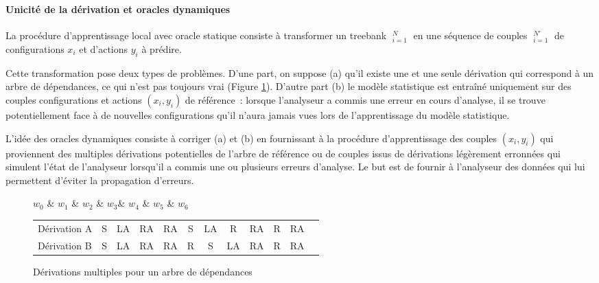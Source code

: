 \documentclass[11pt,openany]{book}
\begin{document}
\paragraph{Unicité de la dérivation et oracles dynamiques}

La procédure d'apprentissage local avec oracle statique 
consiste à transformer un treebank $\mathop{(\mathbf{x}_i,\mathbf{y}_i)}^N_{i=1}$
en une séquence de couples $\mathop{(x_i,y_i)}_{i=1}^{N'}$
de configurations $x_i$ et d'actions $y_i$ à prédire.

Cette transformation pose deux types de problèmes. D'une part, on
suppose (a) qu'il existe une et une seule dérivation qui correspond à un
arbre de dépendances, ce qui n'est pas toujours vrai (Figure \ref{fig-multi-deriv}). D'autre part (b) le modèle statistique est
entraîné uniquement sur des couples configurations et actions
$(x_i,y_i)$ de référence~: lorsque l'analyseur a commis une erreur en
cours d'analyse, il se trouve potentiellement face à de nouvelles
configurations qu'il n'aura jamais vues lors de
l'apprentissage du modèle statistique.

L'idée des oracles dynamiques consiste à corriger (a) et (b)
en  fournissant à la procédure d'apprentissage 
des couples $(x_i,y_i)$ qui proviennent des multiples dérivations
potentielles de l'arbre de référence ou de couples issus de
dérivations légèrement erronnées qui simulent l'état de l'analyseur lorsqu'il a commis
une ou plusieurs erreurs d'analyse. Le but est de fournir à l'analyseur des données qui
lui permettent d'éviter la propagation d'erreurs.

\begin{figure}[htbp]
\begin{center}
\begin{dependency}
\begin{deptext}[column sep=.5cm]
$w_0$ \& $w_1$ \& $w_2$ \& $w_3$\& $w_4$ \& $w_5$ \& $w_6$ \\
\end{deptext}
\end{dependency}
\begin{tabular}{l|ccccccccccc}\toprule
Dérivation A&S&LA&RA&RA&S&LA&R&RA&R&RA\\
Dérivation B&S&LA&RA&RA&R&S&LA&RA&R&RA\\\bottomrule
\end{tabular}
\end{center}
\caption{\label{fig-multi-deriv}Dérivations multiples pour un arbre de dépendances}
\end{figure}
\end{document}
